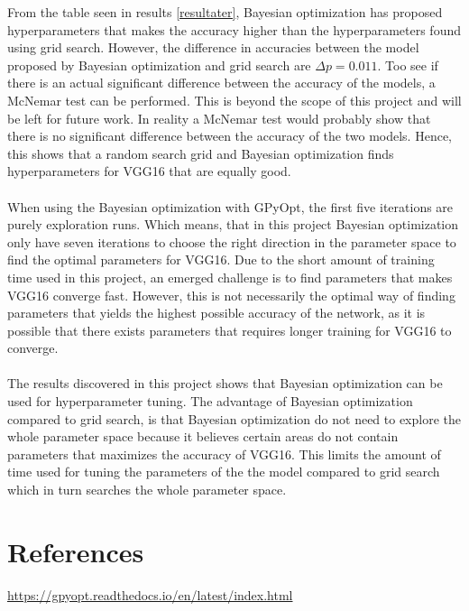 \documentclass[12pt,fleqn]{article}
\begin{document}
From the table seen in results \ref{resultater}, Bayesian optimization has proposed hyperparameters that makes the accuracy higher than the hyperparameters found using grid search. However, the difference in accuracies between the model proposed by Bayesian optimization and grid search are $ \Delta p = 0.011$. Too see if there is an actual significant difference between the accuracy of the models, a McNemar test can be performed. This is beyond the scope of this project and will be left for future work. In reality a McNemar test would probably show that there is no significant difference between the accuracy of the two models. Hence, this shows that a random search grid and Bayesian optimization finds hyperparameters for VGG16 that are equally good.
\\\\
When using the Bayesian optimization with GPyOpt, the first five iterations are purely exploration runs. Which means, that in this project Bayesian optimization only have seven iterations to choose the right direction in the parameter space to find the optimal parameters for VGG16. Due to the short amount of training time used in this project, an emerged challenge is to find parameters that makes VGG16 converge fast. However, this is not necessarily the optimal way of finding parameters that yields the highest possible accuracy of the network, as it is possible that there exists parameters that requires longer training for VGG16 to converge.
\\\\
The results discovered in this project shows that Bayesian optimization can be used for hyperparameter tuning. The advantage of Bayesian optimization compared to grid search, is that Bayesian optimization do not need to explore the whole parameter space because it believes certain areas do not contain parameters that maximizes the accuracy of VGG16. This limits the amount of time used for tuning the parameters of the the model compared to grid search which in turn searches the whole parameter space.

\section{References}
\url{https://gpyopt.readthedocs.io/en/latest/index.html}
\end{document}
